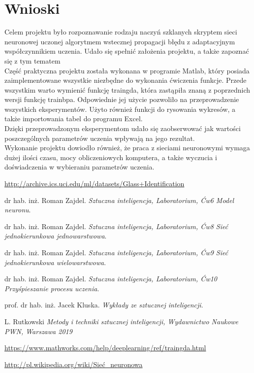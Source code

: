 \documentclass[a4paper, openright, twoside,11pt]{article}
\begin{document}
        \section{Wnioski}
        Celem projektu było rozpoznawanie rodzaju naczyń szklanych skryptem sieci neuronowej uczonej algorytmem wstecznej propagacji błędu z adaptacyjnym współczynnikiem uczenia. Udało się spełnić założenia projektu, a także zapoznać się z tym tematem\\
    Część praktyczna projektu została wykonana w programie Matlab, który posiada zaimplementowane wszystkie niezbędne do wykonania ćwiczenia funkcje. Przede wszystkim warto wymienić funkcję traingda, która zastąpiła znaną z poprzednich wersji funkcję trainbpa. Odpowiednie jej użycie pozwoliło na przeprowadzenie wszystkich eksperymentów. Użyto również funkcji do rysowania wykresów, a także importowania tabel do programu Excel.\\
    Dzięki przeprowadzonym eksperymentom udało się zaobserwować jak wartości poszczególnych parametrów uczenia wpływają na jego rezultat.\\
    Wykonanie projektu dowiodło również, że praca z sieciami neuronowymi wymaga dużej ilości czasu, mocy obliczeniowych komputera, a także wyczucia i doświadczenia w wybieraniu parametrów uczenia.\\[1cm]


 \begin{thebibliography}{9}

\url{http://archive.ics.uci.edu/ml/datasets/Glass+Identification}

dr hab. inż. Roman Zajdel. 
\textit{Sztuczna inteligencja, Laboratorium, Ćw6 Model neuronu}. 

dr hab. inż. Roman Zajdel. 
\textit{Sztuczna inteligencja, Laboratorium, Ćw8 Sieć jednokierunkowa jednowarstwowa}. 

dr hab. inż. Roman Zajdel. 
\textit{Sztuczna inteligencja, Laboratorium, Ćw9 Sieć jednokierunkowa wielowarstwowa}.

dr hab. inż. Roman Zajdel. 
\textit{Sztuczna inteligencja, Laboratorium, Ćw10 Przyśpieszanie procesu uczenia}.

prof. dr hab. inż. Jacek Kluska. 
\textit{Wykłady ze sztucznej inteligencji}.

L. Rutkowski
\textit{Metody i techniki sztucznej inteligencji, Wydawnictwo Naukowe PWN, Warszawa 2019}

\url{https://www.mathworks.com/help/deeplearning/ref/traingda.html}

\url{http://pl.wikipedia.org/wiki/Sieć_neuronowa}

\end{thebibliography}
    
\end{document}
